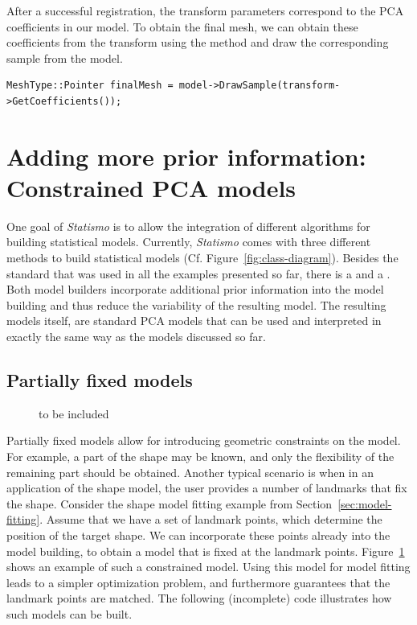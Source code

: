 \documentclass{InsightArticle}
\newcommand{\Statismo}{\emph{Statismo}\xspace}
\begin{document}
After a successful registration, the transform parameters correspond to the PCA coefficients in our model. 
To obtain the final mesh, we can obtain these coefficients from the transform using the method  
and draw the corresponding sample from the model. 
\begin{verbatim}
MeshType::Pointer finalMesh = model->DrawSample(transform->GetCoefficients());
\end{verbatim}


\section{Adding more prior information: Constrained PCA models }
One goal of \Statismo is to allow the integration of  different algorithms for building statistical models.
Currently, \Statismo comes with three different methods to build statistical models (Cf. Figure~\ref{fig:class-diagram}). Besides the standard  that was used in all the examples presented so far, there is a  \cite{TODO} and a  \cite{TODO}. Both model builders incorporate additional prior information into the model building and thus reduce the variability of the resulting model. The resulting models itself, are standard PCA models that can be used and interpreted in exactly the same way as the models discussed so far. 

\subsection{Partially fixed models}
\begin{figure}
  to be included
    \label{fig:constrained-model}
\end{figure}
Partially fixed models allow for introducing geometric constraints on the model. For example, a part of the shape may be known, and only the flexibility of the remaining part should be obtained. Another typical scenario is when in an application of the shape model, the user provides a number of landmarks that fix the shape. 
Consider the shape model fitting example from Section~\ref{sec:model-fitting}. Assume that we have a set of landmark points, which determine the position of the target shape. We can incorporate these points already into the model building, to obtain a model that is fixed at the landmark points. Figure~\ref{fig:constrained-model} shows an example of such a  constrained model.  Using this model for model fitting leads to a simpler optimization problem, and furthermore guarantees that the landmark points are matched. 
The following (incomplete) code illustrates how such models can be built. 
\end{document}
